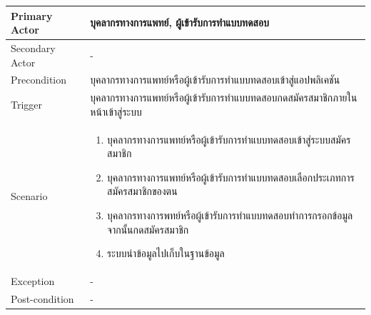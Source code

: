 \documentclass[12pt,oneside,openright,a4paper]{cpe-thai-project}
\begin{document}
\begin{itemize}
\begin{table}[!h]
\begin{tabular}{|p{3cm}|p{12cm}|}
          Primary Actor & บุคลากรทางการแพทย์, ผู้เข้ารับการทำแบบทดสอบ  \\ \hline
          Secondary Actor & - \\ \hline
          Precondition & บุคลากรทางการแพทย์หรือผู้เข้ารับการทำแบบทดสอบเข้าสู่แอปพลิเคชัน \\ \hline
          Trigger & บุคลากรทางการแพทย์หรือผู้เข้ารับการทำแบบทดสอบกดสมัครสมาชิกภายในหน้าเข้าสู่ระบบ \\ \hline
          Scenario & \begin{enumerate}
            \item บุคลากรทางการแพทย์หรือผู้เข้ารับการทำแบบทดสอบเข้าสู่ระบบสมัครสมาชิก
            \item บุคลากรทางการแพทย์หรือผู้เข้ารับการทำแบบทดสอบเลือกประเภทการสมัครสมาชิกของตน
            \item บุคลากรทางการพทย์หรือผู้เข้ารับการทำแบบทดสอบทำการกรอกข้อมูลจากนั้นกดสมัครสมาชิก
            \item ระบบนำข้อมูลไปเก็บในฐานข้อมูล
           
          \end{enumerate} \\ \hline
          Exception & - \\ \hline
          Post-condition & - \\ \hline
      
          \end{tabular}
          \end{table}
  \end{itemize}

\newpage
\end{document}
